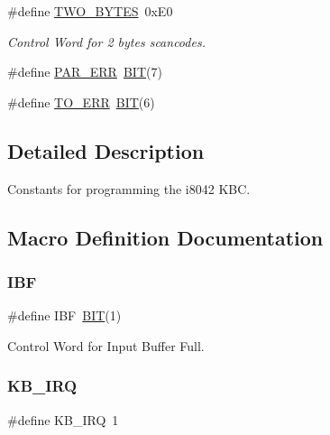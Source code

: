 \begin{DoxyCompactItemize}
\#define \hyperlink{group__i8042_gab427e6926fcc47eb1c02c1f78162b6f6}{T\+W\+O\+\_\+\+B\+Y\+T\+ES}~0x\+E0
\begin{DoxyCompactList}\small\item\em Control Word for 2 bytes scancodes. \end{DoxyCompactList}\item 
\#define \hyperlink{group__i8042_ga307ab71673e26ec42b28a3bca05d4cb5}{P\+A\+R\+\_\+\+E\+RR}~\hyperlink{tools_8h_a3a8ea58898cb58fc96013383d39f482c}{B\+IT}(7)
\item 
\#define \hyperlink{group__i8042_gad16f61e2bf70f6c7685e826224ed177f}{T\+O\+\_\+\+E\+RR}~\hyperlink{tools_8h_a3a8ea58898cb58fc96013383d39f482c}{B\+IT}(6)
\end{DoxyCompactItemize}


\subsection{Detailed Description}
Constants for programming the i8042 K\+BC. 

\subsection{Macro Definition Documentation}
\hypertarget{group__i8042_ga3c48b10907056351582baf9f6478598e}{}\label{group__i8042_ga3c48b10907056351582baf9f6478598e} 
\subsubsection{\texorpdfstring{I\+BF}{IBF}}
{\footnotesize\ttfamily \#define I\+BF~\hyperlink{tools_8h_a3a8ea58898cb58fc96013383d39f482c}{B\+IT}(1)}



Control Word for Input Buffer Full. 

\hypertarget{group__i8042_gae36fc325bc821e866e90d0e66f9cc168}{}\label{group__i8042_gae36fc325bc821e866e90d0e66f9cc168} 
\subsubsection{\texorpdfstring{K\+B\+\_\+\+I\+RQ}{KB\_IRQ}}
{\footnotesize\ttfamily \#define K\+B\+\_\+\+I\+RQ~1}

\hypertarget{group__i8042_gae1f561b740c8aed366ab0f6618e391f3}{}\label{group__i8042_gae1f561b740c8aed366ab0f6618e391f3} 
